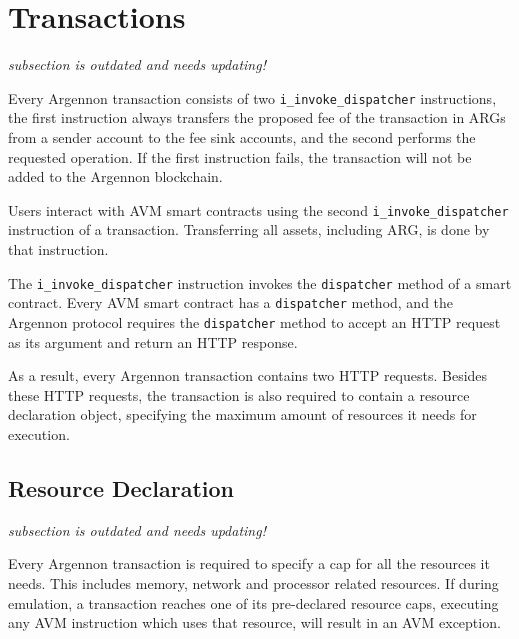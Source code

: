 

\section{Transactions}\label{sec:transactions}
\emph{subsection is outdated and needs updating!}

Every Argennon transaction consists of two \texttt{i\_invoke\_dispatcher} instructions, the first instruction always
transfers the proposed fee of the transaction in ARGs from a sender account to the fee sink accounts, and
the second performs the requested operation. If the first instruction fails, the transaction will not be added to
the Argennon blockchain.

Users interact with AVM smart contracts using
the second \texttt{i\_invoke\_dispatcher} instruction of a transaction.
Transferring all assets, including ARG, is done by that instruction.

The \texttt{i\_invoke\_dispatcher} instruction invokes the \texttt{dispatcher} method of a smart contract. Every AVM
smart contract has a \texttt{dispatcher} method, and the Argennon protocol requires
the \texttt{dispatcher} method to accept an HTTP request as its argument and
return an HTTP response.

As a result, every Argennon transaction contains two HTTP requests. Besides these HTTP requests, the
transaction is also required to contain a resource declaration object, specifying the maximum amount of resources
it needs for execution.


\subsection{Resource Declaration}\label{subsec:resource-declaration}
\emph{subsection is outdated and needs updating!}

Every Argennon transaction is required to specify a cap for all the resources it needs. This
includes memory, network and processor related resources. If during emulation, a transaction reaches one of its
pre-declared resource caps, executing any AVM instruction which uses that resource, will result in an AVM exception.

